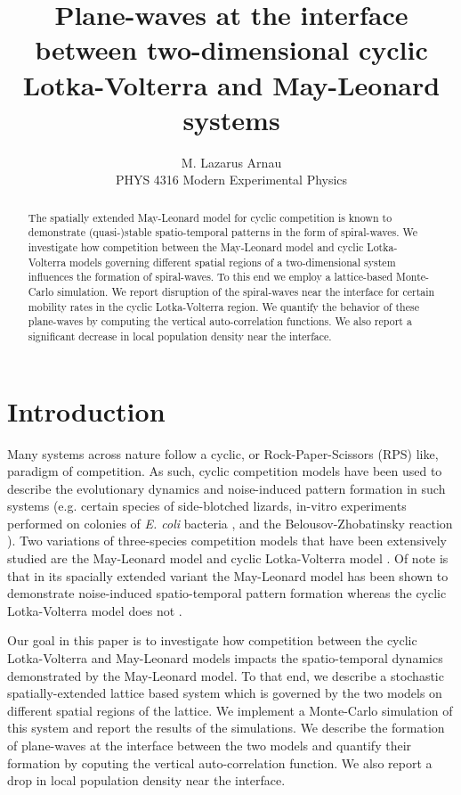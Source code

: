 \documentclass[12pt]{article}
\title{Plane-waves at the interface between two-dimensional cyclic Lotka-Volterra and May-Leonard systems}
\author{M. Lazarus Arnau\\ PHYS 4316 Modern Experimental Physics}
\begin{document}
\maketitle

\begin{abstract}
    The spatially extended May-Leonard model for cyclic competition is known 
    to demonstrate (quasi-)stable spatio-temporal patterns in the form of
    spiral-waves. We investigate how competition between the May-Leonard model 
    and cyclic Lotka-Volterra models governing different spatial regions of a 
    two-dimensional system influences the formation of spiral-waves. To this end
    we employ a lattice-based Monte-Carlo simulation. We report disruption of the
    spiral-waves near the interface for certain mobility rates in the cyclic Lotka-Volterra
    region. We quantify the behavior of these plane-waves by computing the vertical
    auto-correlation functions. We also report a significant decrease in local
    population density near the interface.
\end{abstract}
\section{Introduction}%
\label{sec:introduction}

Many systems across nature follow a cyclic, or Rock-Paper-Scissors (RPS) like, 
paradigm of competition. As such, cyclic competition models have been used to 
describe the evolutionary dynamics and noise-induced pattern formation in such systems 
(e.g. certain species of side-blotched lizards\cite{lizards}, in-vitro experiments performed on colonies of \textit{E. coli}
bacteria \cite{ecoli}, and the Belousov-Zhobatinsky reaction \cite{bz}). Two variations
of three-species competition models that have been extensively studied are the 
May-Leonard model and cyclic Lotka-Volterra model \cite{dobromasyletal}. 
Of note is that in its spacially extended variant the May-Leonard model has 
been shown to demonstrate noise-induced spatio-temporal pattern formation whereas
the cyclic Lotka-Volterra model does not \cite{dobromasyletal}.

Our goal in this paper is to investigate how competition between the cyclic Lotka-Volterra 
and May-Leonard models impacts the spatio-temporal dynamics demonstrated by the 
May-Leonard model. To that end, we describe a stochastic spatially-extended 
lattice based system which is governed by the two models on different spatial regions
of the lattice. We implement a Monte-Carlo simulation of this system and report 
the results of the simulations. We describe the formation of plane-waves at the
interface between the two models and quantify their formation by coputing the 
vertical auto-correlation function. We also report a drop in local population 
density near the interface.
\end{document}
